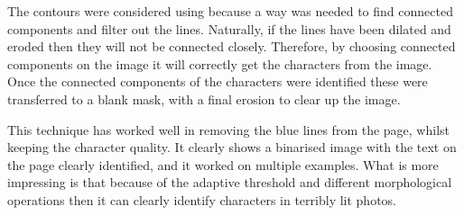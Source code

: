 The contours were considered using because a way was needed to find connected components and filter out the lines. Naturally, if the lines have been dilated and eroded then they will not be connected closely. Therefore, by choosing connected components on the image it will correctly get the characters from the image. Once the connected components of the characters were identified these were transferred to a blank mask, with a final erosion to clear up the image.

This technique has worked well in removing the blue lines from the page, whilst keeping the character quality. It clearly shows a binarised image with the text on the page clearly identified, and it worked on multiple examples. What is more impressing is that because of the adaptive threshold and different morphological operations then it can clearly identify characters in terribly lit photos. 
